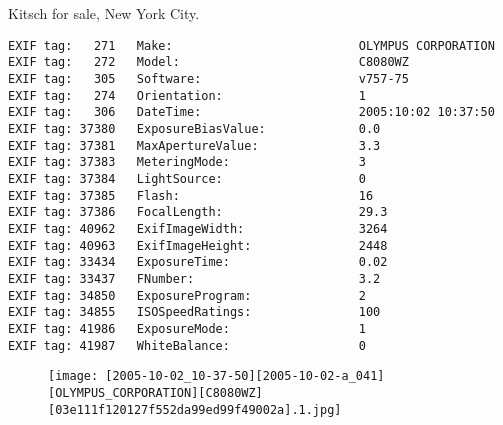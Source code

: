 \section{\protect{}}
\noindent Kitsch for sale, New York City.
\noindent
\begin{lstlisting}
EXIF tag:   271   Make:                          OLYMPUS CORPORATION
EXIF tag:   272   Model:                         C8080WZ
EXIF tag:   305   Software:                      v757-75
EXIF tag:   274   Orientation:                   1
EXIF tag:   306   DateTime:                      2005:10:02 10:37:50
EXIF tag: 37380   ExposureBiasValue:             0.0
EXIF tag: 37381   MaxApertureValue:              3.3
EXIF tag: 37383   MeteringMode:                  3
EXIF tag: 37384   LightSource:                   0
EXIF tag: 37385   Flash:                         16
EXIF tag: 37386   FocalLength:                   29.3
EXIF tag: 40962   ExifImageWidth:                3264
EXIF tag: 40963   ExifImageHeight:               2448
EXIF tag: 33434   ExposureTime:                  0.02
EXIF tag: 33437   FNumber:                       3.2
EXIF tag: 34850   ExposureProgram:               2
EXIF tag: 34855   ISOSpeedRatings:               100
EXIF tag: 41986   ExposureMode:                  1
EXIF tag: 41987   WhiteBalance:                  0

\end{lstlisting}
\clearpage
\begin{figure}
\raggedleft
\texttt{[image: [2005-10-02\_10-37-50][2005-10-02-a\_041][OLYMPUS\_CORPORATION][C8080WZ][03e111f120127f552da99ed99f49002a].1.jpg]}
\end{figure}


\clearpage
